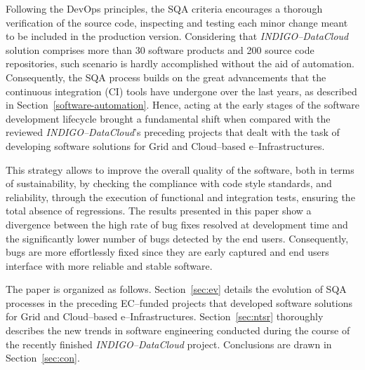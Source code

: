 Following the DevOps principles, the SQA criteria encourages a thorough verification of the source code, inspecting
and testing each minor change meant to be included in the production version. Considering that 
{\sl INDIGO--DataCloud} solution comprises more than 30 software products and 200 source code repositories, such 
scenario is hardly accomplished without the aid of automation. Consequently, the SQA process builds on the great 
advancements that the continuous integration (CI) tools have undergone over the last years, as described in 
Section~\ref{software-automation}. Hence, acting at the early stages of the software development lifecycle brought
a fundamental shift when compared with the reviewed {\sl INDIGO--DataCloud}'s preceding projects that dealt with
the task of developing software solutions for Grid and Cloud--based e--Infrastructures.

This strategy 
allows to improve the overall quality of the software, both in terms of sustainability, by checking the compliance with code style standards, and 
reliability, through the execution of functional and integration tests, ensuring the total absence of regressions. The results
presented in this paper show a divergence between the high rate of bug fixes resolved at development time and the 
significantly lower number of bugs detected by the end users. Consequently, bugs are more effortlessly fixed since they 
are early captured and end users interface with more reliable and stable software.

The paper is organized as follows. %
Section~\ref{sec:ev} details the evolution of SQA processes in the preceding EC--funded projects that developed 
software solutions for Grid and Cloud--based e--Infrastructures. 
Section~\ref{sec:ntsr} thoroughly describes the new trends in software engineering conducted during the course of the recently finished
{\sl INDIGO--DataCloud} project. Conclusions are drawn in Section~\ref{sec:con}.


